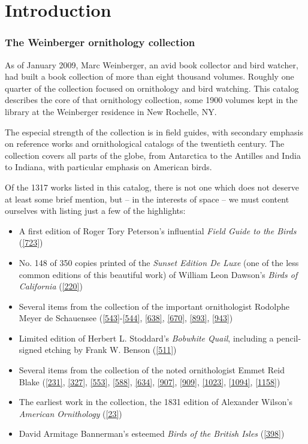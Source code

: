 \chapter*{Introduction}

\subsection*{The Weinberger ornithology collection}

As of January 2009, Marc Weinberger, an avid book collector and bird watcher, had
built a book collection of more than eight thousand volumes. Roughly one quarter
of the collection focused on ornithology and bird watching. This catalog describes
the core of that ornithology collection, some 1900 volumes kept in the library at
the Weinberger residence in New Rochelle, NY.

The especial strength of the collection is in field guides, with secondary emphasis
on reference works and ornithological catalogs of the twentieth century.
The collection covers all parts of the globe, from Antarctica to the Antilles and
India to Indiana, with particular emphasis on American birds.

Of the 1317 works listed in this catalog, there is not one which does not deserve
at least some brief mention, but -- in the interests of space -- we must content
ourselves with listing just a few of the highlights:
\begin{itemize}
\item A first edition of Roger Tory Peterson's influential \textit{Field Guide to
	the Birds} (\ref{723})
\item No. 148 of 350 copies printed of the \textit{Sunset Edition De Luxe} (one
	of the less common editions of this beautiful work) of William Leon Dawson's
	\textit{Birds of California} (\ref{220})
\item Several items from the collection of the important ornithologist Rodolphe
	Meyer de Schauensee (\ref{543}-\ref{544}, \ref{638}, \ref{670}, \ref{893}, \ref{943})
\item Limited edition of Herbert L. Stoddard's \textit{Bobwhite Quail}, including
	a pencil-signed etching by Frank W. Benson (\ref{511})
\item Several items from the collection of the noted ornithologist Emmet Reid
	Blake (\ref{231}, \ref{327}, \ref{553}, \ref{588}, \ref{634}, \ref{907},
	\ref{909}, \ref{1023}, \ref{1094}, \ref{1158})
\item The earliest work in the collection, the 1831 edition of Alexander Wilson's
	\textit{American Ornithology} (\ref{23})
\item David Armitage Bannerman's esteemed \textit{Birds of the British Isles} (\ref{398})
\end{itemize}

